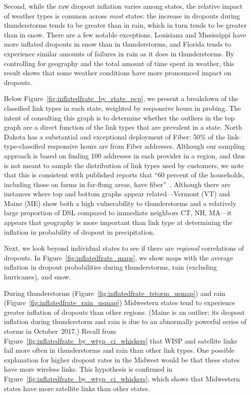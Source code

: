 Second, while the raw dropout inflation varies among states, the
relative impact of weather types is common across \emph{most} states:
the increase in dropouts during thunderstorms tends to be greater than
in rain, which in turn tends to be greater than in snow.
%
There are a few notable exceptions.
%
Louisiana and Mississippi have more inflated dropouts in snow than in
thunderstorms, and Florida tends to experience similar amounts of
failures in rain as it does in thunderstorms.
%
By controlling for geography and the total amount of time spent in
weather, this result shows that some weather conditions have more
pronounced impact on dropouts.

Below Figure~\ref{fig:inflatedfrate_by_state_pcp}, we
present a breakdown of the classified link types in each
state, weighted by responsive hours in probing.  The intent
of consulting this graph is to determine whether the outliers
in the top graph are a direct function of the link types  that
are prevalent in a state. North
Dakota has a substantial and exceptional deployment of
Fiber: 50\% of the link-type-classified responsive hours are
from Fiber addresses.  Although our sampling approach is
based on finding 100 addresses in each provider in a region,
and thus is not meant to sample the distribution of link
types used by customers, we note that this is consistent
with published reports that ``60 percent of the households,
including those on farms in far-flung areas, have
fiber''~\cite{csgmidwest}.  Although there are instances where
top and bottom graphs appear related---Vermont (VT) and Maine (ME) show both a
high vulnerability to thunderstorms and a relatively large proportion
of DSL compared to immediate neighbors CT, NH, MA---it appears that
geography is more important than link type at determining the
inflation in probability of dropout in precipitation.




Next, we look beyond individual states to see if there are
\emph{regional} correlations of dropouts.
%
In Figure~\ref{fig:inflatedfrate_maps}, we show maps with the average
inflation in dropout probabilities during thunderstorms, rain
(excluding hurricanes), and snow.


During thunderstorms (Figure~\ref{fig:inflatedfrate_tstorm_usmap}) and
rain (Figure~\ref{fig:inflatedfrate_rain_usmap}) Midwestern states tend
to experience greater inflation of dropouts than other regions.
%
(Maine is an outlier; its dropout inflation during thunderstorm and
rain is due to an abnormally powerful series of storms in
October~2017.)
%
Recall from Figure~\ref{fig:inflatedfrate_by_wtyp_ci_whiskers} that
WISP and satellite links fail more often in thunderstorms and rain than
other link types.
%
One possible explanation for higher dropout rates in the Midwest would
be that these states have more wireless links.
%
This hypothesis is confirmed in
Figure~\ref{fig:inflatedfrate_by_wtyp_ci_whiskers}, which shows that
Midwestern states have more satellite links than other states.


